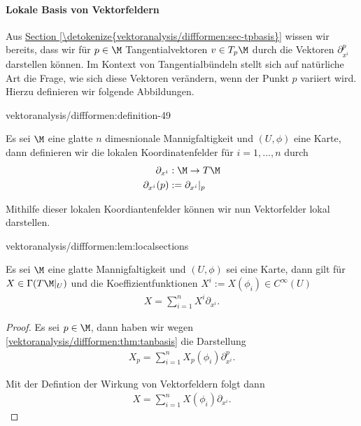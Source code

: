 \documentclass[letterpaper,10pt,english]{jupyterBook}
\begin{document}
\paragraph{Lokale Basis von Vektorfeldern}
\label{\detokenize{vektoranalysis/diffformen:lokale-basis-von-vektorfeldern}}
\par
Aus \hyperref[\detokenize{vektoranalysis/diffformen:sec-tpbasis}]{Section \ref{\detokenize{vektoranalysis/diffformen:sec-tpbasis}}} wissen wir bereits, dass wir für \(p\in\M\) Tangentialvektoren \(v\in T_p\M\) durch die Vektoren \(\partial_{x^i}^p\) darstellen können. Im Kontext von Tangentialbündeln stellt sich auf natürliche Art die Frage, wie sich diese Vektoren verändern, wenn der Punkt \(p\) variiert wird. Hierzu definieren wir folgende Abbildungen.
\begin{definition}{}{vektoranalysis/diffformen:definition-49}



\par
Es sei \(\M\) eine glatte \(n\) dimesnionale Mannigfaltigkeit und \((U,\phi)\) eine Karte, dann definieren wir die lokalen Koordinatenfelder
für \(i=1,\ldots,n\) durch
\begin{align*}
\partial_{x^{i}}&:\M\to T\M\\
\partial_{x^{i}}(p)&:= \partial_{x^{i}}\rvert_p
\end{align*}\end{definition}

\par
Mithilfe dieser lokalen Koordiantenfelder können wir nun Vektorfelder lokal darstellen.
\begin{lemma}{}{vektoranalysis/diffformen:lem:localsections}



\par
Es sei \(\M\) eine glatte Mannigfaltigkeit und \((U,\phi)\) sei eine Karte, dann gilt für \(X\in\Gamma(T\M\rvert_U)\) und die Koeffizientfunktionen \(X^i:=X(\phi_i)\in C^\infty(U)\)
\begin{align*}
X = \sum_{i=1}^n X^i \partial_{x^{i}}.
\end{align*}\end{lemma}

\begin{proof}
 Es sei \(p\in\M\), dann haben wir wegen  \cref{vektoranalysis/diffformen:thm:tanbasis} die Darstellung
\begin{align*}
X_p = \sum_{i=1}^n X_p(\phi_i) \partial_{x^i}^p.
\end{align*}
\par
Mit der Defintion der Wirkung von Vektorfeldern folgt dann
\begin{align*}
X = \sum_{i=1}^n X(\phi_i) \partial_{x^i}.
\end{align*}\end{proof}
\end{document}
